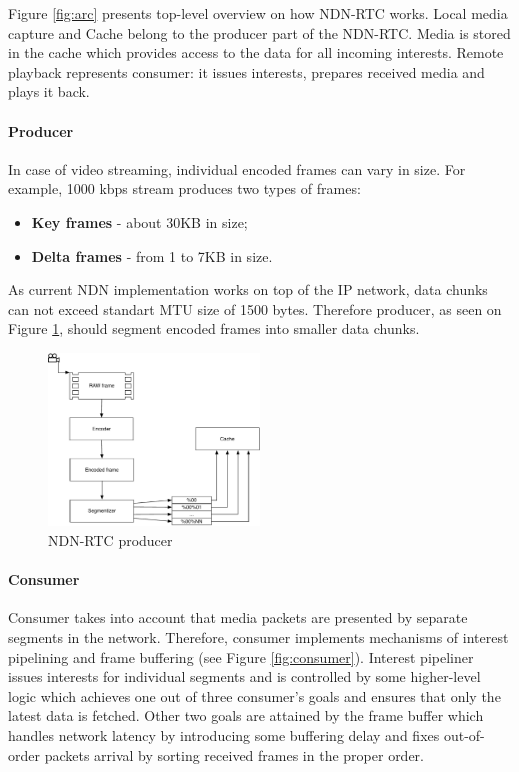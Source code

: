 \documentclass[10pt]{proc}
\begin{document}
Figure \ref{fig:arc} presents top-level overview on how NDN-RTC works. Local media capture and Cache belong to the producer part of the NDN-RTC. Media is stored in the cache which provides access to the data for all incoming interests. Remote playback represents consumer: it issues interests, prepares received media and plays it back.

\paragraph{Producer}

In case of video streaming, individual encoded frames can vary in size. For example, 1000 kbps stream produces two types of frames:
\begin{itemize}
\item \textbf{Key frames} - about 30KB in size;
\item \textbf{Delta frames} - from 1 to 7KB in size. 
\end{itemize}

As current NDN implementation works on top of the IP network, data chunks can not exceed standart MTU size of 1500 bytes. Therefore producer, as seen on Figure \ref{fig:producer}, should segment encoded frames into smaller data chunks.

\begin{figure}[Ht!]
\centering
\includegraphics[width=0.5\textwidth]{producer}
\caption{NDN-RTC producer}
\label{fig:producer}
\end{figure}

\paragraph{Consumer}

Consumer takes into account that media packets are presented by separate segments in the network. Therefore, consumer implements mechanisms of interest pipelining and frame buffering (see Figure \ref{fig:consumer}). Interest pipeliner issues interests for individual segments and is controlled by some higher-level logic which achieves one out of three consumer's goals and ensures that only the latest data is fetched. Other two goals are attained by the frame buffer which handles network latency by introducing some buffering delay and fixes out-of-order packets arrival by sorting received frames in the proper order. 
\end{document}
